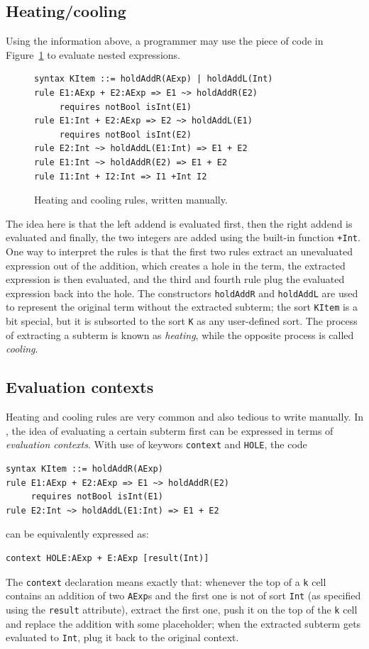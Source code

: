 \documentclass[nolot,nolof,nocover,printed]{fithesis3}
\begin{document}
\subsection{Heating/cooling}
Using the information above, a programmer may use the piece of \K code in Figure~\ref{manualHeatCool} to evaluate nested expressions.
\begin{figure}
\begin{lstlisting}
syntax KItem ::= holdAddR(AExp) | holdAddL(Int)
rule E1:AExp + E2:AExp => E1 ~> holdAddR(E2)
     requires notBool isInt(E1)
rule E1:Int + E2:AExp => E2 ~> holdAddL(E1)
     requires notBool isInt(E2)
rule E2:Int ~> holdAddL(E1:Int) => E1 + E2
rule E1:Int ~> holdAddR(E2) => E1 + E2
rule I1:Int + I2:Int => I1 +Int I2
\end{lstlisting}
\caption{Heating and cooling rules, written manually.}
\label{manualHeatCool}
\end{figure}
The idea here is that the left addend is evaluated first, then the right addend is evaluated and finally, the two integers are added using the built-in function \texttt{+Int}. One way to interpret the rules is that the first two rules extract an unevaluated expression out of the addition, which creates a hole in the term, the extracted expression is then evaluated, and the third and fourth rule plug the evaluated expression back into the hole. The constructors \texttt{holdAddR} and \texttt{holdAddL} are used to represent the original term without the extracted subterm; the sort \texttt{KItem} is a bit special, but it is subsorted to the sort \texttt{K} as any user-defined sort. The process of extracting a subterm is known as \textit{heating}, while the opposite process is called \textit{cooling}. 

\subsection{Evaluation contexts}
Heating and cooling rules are very common and also tedious to write manually. In \K, the idea of evaluating a certain subterm first can be expressed in terms of \textit{evaluation contexts}. With use of keywors \texttt{context} and \texttt{HOLE}, the \K code
\begin{lstlisting}
syntax KItem ::= holdAddR(AExp)
rule E1:AExp + E2:AExp => E1 ~> holdAddR(E2)
     requires notBool isInt(E1)
rule E2:Int ~> holdAddL(E1:Int) => E1 + E2
\end{lstlisting}
can be equivalently expressed as:
\begin{lstlisting}
context HOLE:AExp + E:AExp [result(Int)]
\end{lstlisting}
The \texttt{context} declaration means exactly that: whenever the top of a \texttt{k} cell contains an addition of two \texttt{AExp}s and the first one is not of sort \texttt{Int} (as specified using the \texttt{result} attribute), extract the first one, push it on the top of the \texttt{k} cell and replace the addition with some placeholder; when the extracted subterm gets evaluated to \texttt{Int}, plug it back to the original context.
\end{document}
